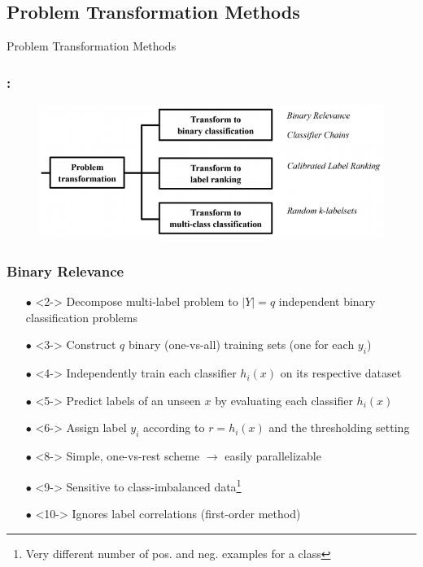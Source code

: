 \documentclass{beamer}
\begin{document}
\subsection{Problem Transformation Methods}
\begin{frame}
\Huge{\centerline{Problem Transformation Methods}}
\end{frame}
\begin{frame}
\frametitle{\insertsection : \insertsubsection}
\begin{figure}
\begin{center}
\includegraphics[scale = 0.7]{images/pt.png}
\end{center}
\end{figure}
\end{frame}
\begin{frame}
\frametitle{Binary Relevance}

\begin{itemize}
\item[$\bullet$] <2-> Decompose multi-label problem to $|Y|=q$ independent binary classification problems
\item[$\bullet$] <3-> Construct $q$ binary (one-vs-all) training sets (one for each $y_i$)
\item[$\bullet$] <4-> Independently train each classifier $h_i(x)$ on its respective dataset

\item[$\bullet$] <5-> Predict labels of an unseen $x$ by evaluating each classifier $h_i(x)$
\item[$\bullet$] <6-> Assign label $y_i$ according to $r = h_i(x)$ and the
  thresholding setting 
\end{itemize}

\begin{itemize}
\item[$\bullet$] <8-> Simple, one-vs-rest scheme $\rightarrow$ easily parallelizable
\item[$\bullet$] <9-> Sensitive to class-imbalanced data\footnote{Very different
    number of pos. and neg. examples for a class}
\item[$\bullet$] <10-> Ignores label correlations (first-order method)
\end{itemize}

\end{frame}
\end{document}
